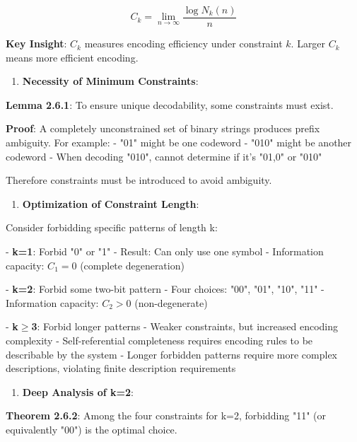 \begin{equation}
C_k = \lim_{n \to \infty} \frac{\log N_k(n)}{n}
\end{equation}
   
   \textbf{Key Insight}: $C_k$ measures encoding efficiency under constraint $k$. Larger $C_k$ means more efficient encoding.
   
\begin{enumerate}
\item \textbf{Necessity of Minimum Constraints}:
\end{enumerate}
   
   \textbf{Lemma 2.6.1}: To ensure unique decodability, some constraints must exist.
\label{lem:2.6.1}
   
   \textbf{Proof}: A completely unconstrained set of binary strings produces prefix ambiguity. For example:
   - "01" might be one codeword
   - "010" might be another codeword
   - When decoding "010", cannot determine if it's "01,0" or "010"
   
   Therefore constraints must be introduced to avoid ambiguity.
   
\begin{enumerate}
\item \textbf{Optimization of Constraint Length}:
\end{enumerate}
   Consider forbidding specific patterns of length k:
   
   - \textbf{k=1}: Forbid "0" or "1" 
     - Result: Can only use one symbol
     - Information capacity: $C_1 = 0$ (complete degeneration)
   
   - \textbf{k=2}: Forbid some two-bit pattern
     - Four choices: "00", "01", "10", "11"
     - Information capacity: $C_2 > 0$ (non-degenerate)
   
   - \textbf{k$\geq$3}: Forbid longer patterns
     - Weaker constraints, but increased encoding complexity
     - Self-referential completeness requires encoding rules to be describable by the system
     - Longer forbidden patterns require more complex descriptions, violating finite description requirements
   
\begin{enumerate}
\item \textbf{Deep Analysis of k=2}:
\end{enumerate}
   
   \textbf{Theorem 2.6.2}: Among the four constraints for k=2, forbidding "11" (or equivalently "00") is the optimal choice.
\label{thm:2.6.2}
   
